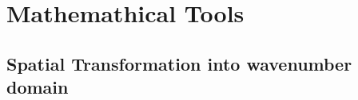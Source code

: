 \documentclass[../Dissertation]{subfiles}
\begin{document}
  \section{Mathemathical Tools}
    \subsection{Spatial Transformation into wavenumber domain}
  
\end{document}
